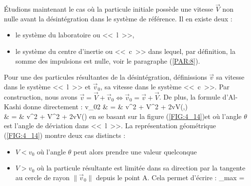 \'Etudions maintenant le cas o\`u la particule initiale poss\`ede une vitesse $\vec{V}$ non nulle avant la d\'esint\'egration dans le syst\`eme de r\'ef\'erence. Il en existe deux :
\begin{itemize}
	\item le syst\`eme du laboratoire ou <<~l~>>,
	\item le syst\`eme du centre d'inertie ou <<~c~>> dans lequel, par d\'efinition, la somme des impulsions est nulle, voir le paragraphe (\ref{PAR:8}).
\end{itemize}
Pour une des particules r\'esultantes de la d\'esint\'egration, d\'efinissions $\vec{v}$ sa vitesse dans le syst\`eme <<~l~>> et $\vec{v}_{0}$, sa vitesse dans le syst\`eme <<~c~>>. Par construction, nous avons $\vec{v} = \vec{V} + \vec{v}_{0} \Leftrightarrow \vec{v}_{0} = \vec{v} + \vec{V}$. De plus, la formule d'Al-Kashi donne directement :
\bea
	v_{0}{2} & = & v^{2} + V^{2} + 2vV\cos(\langle {},\rangle) \nonumber \\
	& = & v^{2} + V^{2} + 2vV\cos(\theta) \nonumber
\eea
en se basant sur la figure (\ref{FIG:4_14})et o\`u l'angle $\theta$ est l'angle de d\'eviation dans <<~l~>>. La repr\'esentation g\'eom\'etrique (\ref{FIG:4_14}) montre deux cas distincts :
\begin{itemize}
	\item $V < v_{0}$ o\`u l'angle $\theta$ peut alors prendre une valeur quelconque
	\item $V > v_{0}$ o\`u la particule r\'esultante est limit\'ee dans sa direction par la tangente au cercle de rayon $\lVert \vec{v}_{0} \rVert$ depuis le point A. Cela permet d'\'ecrire :
	\be
		\sin\theta_{max} =  \label{EQ:16_4}
	\ee
\end{itemize}

